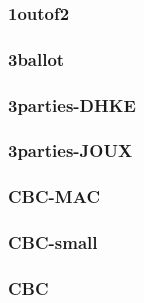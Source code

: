 

\begin{frame}\frametitle{1outof2}
\begin{figure}
\begin{center}

\end{center}
\end{figure}
\end{frame}
\begin{frame}\frametitle{3ballot}
\begin{figure}
\begin{center}

\end{center}
\end{figure}
\end{frame}
\begin{frame}\frametitle{3parties-DHKE}
\begin{figure}
\begin{center}

\end{center}
\end{figure}
\end{frame}
\begin{frame}\frametitle{3parties-JOUX}
\begin{figure}
\begin{center}

\end{center}
\end{figure}
\end{frame}
\begin{frame}\frametitle{CBC-MAC}
\begin{figure}
\begin{center}

\end{center}
\end{figure}
\end{frame}
\begin{frame}\frametitle{CBC-small}
\begin{figure}
\begin{center}

\end{center}
\end{figure}
\end{frame}
\begin{frame}\frametitle{CBC}
\begin{figure}
\begin{center}

\end{center}
\end{figure}
\end{frame}
